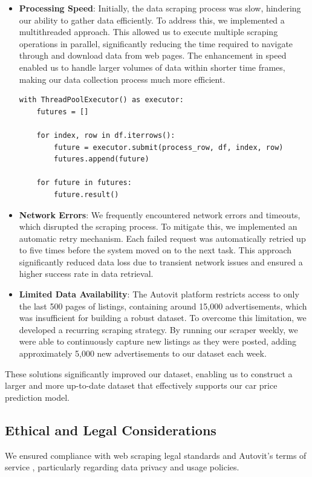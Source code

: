 \begin{itemize}
    \item \textbf{Processing Speed}: Initially, the data scraping process was slow, hindering our ability to gather data efficiently. To address this, we implemented a multithreaded approach. This allowed us to execute multiple scraping operations in parallel, significantly reducing the time required to navigate through and download data from web pages. The enhancement in speed enabled us to handle larger volumes of data within shorter time frames, making our data collection process much more efficient.

\begin{lstlisting}
with ThreadPoolExecutor() as executor:
    futures = []

    for index, row in df.iterrows():
        future = executor.submit(process_row, df, index, row)
        futures.append(future)

    for future in futures:
        future.result()
\end{lstlisting}

    \item \textbf{Network Errors}: We frequently encountered network errors and timeouts, which disrupted the scraping process. To mitigate this, we implemented an automatic retry mechanism. Each failed request was automatically retried up to five times before the system moved on to the next task. This approach significantly reduced data loss due to transient network issues and ensured a higher success rate in data retrieval.

    \item \textbf{Limited Data Availability}: The Autovit platform restricts access to only the last 500 pages of listings, containing around 15,000 advertisements, which was insufficient for building a robust dataset. To overcome this limitation, we developed a recurring scraping strategy. By running our scraper weekly, we were able to continuously capture new listings as they were posted, adding approximately 5,000 new advertisements to our dataset each week. 
\end{itemize}

These solutions significantly improved our dataset, enabling us to construct a larger and more up-to-date dataset that effectively supports our car price prediction model.

\subsection{Ethical and Legal Considerations}
We ensured compliance with web scraping legal standards and Autovit’s terms of service \cite{AutovitTerms}, particularly regarding data privacy and usage policies.

